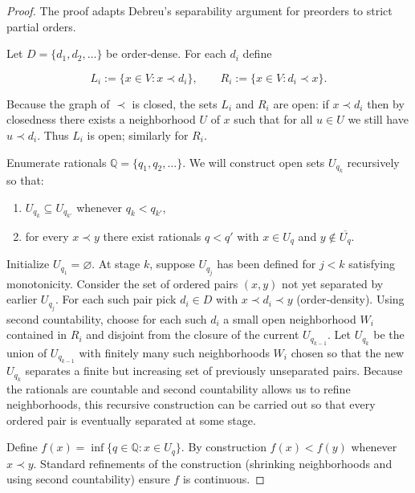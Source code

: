\documentclass[10pt,a4paper]{amsart}
\begin{document}
\begin{proof}
The proof adapts Debreu's separability argument for preorders to strict
partial orders.

Let $D=\{d_1,d_2,\dots\}$ be order‑dense. For each $d_i$ define


\[
L_i:=\{x\in V: x\prec d_i\},\qquad R_i:=\{x\in V: d_i\prec x\}.
\]


Because the graph of $\prec$ is closed, the sets $L_i$ and $R_i$ are
open: if $x\prec d_i$ then by closedness there exists a neighborhood $U$
of $x$ such that for all $u\in U$ we still have $u\prec d_i$. Thus $L_i$
is open; similarly for $R_i$.

Enumerate rationals $\mathbb Q=\{q_1,q_2,\dots\}$. We will construct open
sets $U_{q_k}$ recursively so that:
\begin{enumerate}[label=(\roman*)]
  \item $U_{q_k}\subseteq U_{q_{k'}}$ whenever $q_k<q_{k'}$,
  \item for every $x\prec y$ there exist rationals $q<q'$ with $x\in U_q$
    and $y\notin\overline{U_q}$.
\end{enumerate}

Initialize $U_{q_1}=\varnothing$. At stage $k$, suppose $U_{q_j}$ has been
defined for $j<k$ satisfying monotonicity. Consider the set of ordered
pairs $(x,y)$ not yet separated by earlier $U_{q_j}$. For each such pair
pick $d_i\in D$ with $x\prec d_i\prec y$ (order‑density). Using second
countability, choose for each such $d_i$ a small open neighborhood $W_i$
contained in $R_i$ and disjoint from the closure of the current
$U_{q_{k-1}}$. Let $U_{q_k}$ be the union of $U_{q_{k-1}}$ with finitely
many such neighborhoods $W_i$ chosen so that the new $U_{q_k}$ separates
a finite but increasing set of previously unseparated pairs. Because the
rationals are countable and second countability allows us to refine
neighborhoods, this recursive construction can be carried out so that
every ordered pair is eventually separated at some stage.

Define $f(x)=\inf\{q\in\mathbb Q: x\in U_q\}$. By construction $f(x)<f(y)$
whenever $x\prec y$. Standard refinements of the construction (shrinking
neighborhoods and using second countability) ensure $f$ is continuous.
\end{proof}
\end{document}
